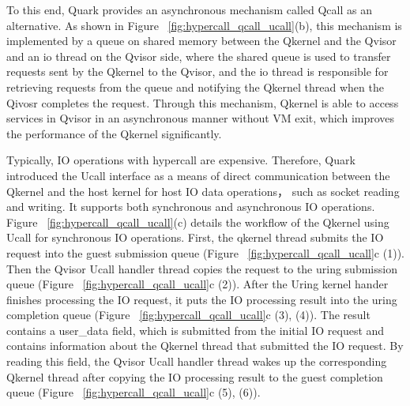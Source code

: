 To this end, Quark provides an asynchronous mechanism called Qcall as an alternative. 
As shown in Figure ~\ref{fig:hypercall_qcall_ucall}(b), this mechanism is implemented by a queue on shared memory between the Qkernel and the Qvisor and an io thread on the Qvisor side, where the
shared queue is used to transfer requests sent by the Qkernel to the Qvisor, and the io thread is responsible for retrieving requests from the queue and notifying the Qkernel thread when the Qivosr completes 
the request. Through this mechanism, Qkernel is able to access services in Qvisor in an asynchronous manner without VM exit, which improves the performance of the Qkernel significantly.

Typically, IO operations with hypercall are expensive. Therefore, Quark introduced the Ucall interface as a means of direct communication between the Qkernel and the host kernel for host 
IO data operations，  such as socket reading and writing. It supports both synchronous and asynchronous IO operations. Figure ~\ref{fig:hypercall_qcall_ucall}(c) details the workflow of the Qkernel 
using Ucall for synchronous IO operations. First, the qkernel thread submits the IO request into the guest submission queue (Figure ~\ref{fig:hypercall_qcall_ucall}c (1)). Then the Qvisor Ucall handler thread copies the request to the uring submission 
queue (Figure ~\ref{fig:hypercall_qcall_ucall}c (2)). After the Uring kernel hander finishes processing the IO request, it puts the IO processing result into the uring completion queue (Figure ~\ref{fig:hypercall_qcall_ucall}c (3), (4)). The result 
contains a user\_data field, which is submitted from the initial IO request and contains information about the Qkernel thread that submitted the IO request. By reading this field, the Qvisor Ucall handler thread wakes up the corresponding Qkernel thread 
after copying the IO processing result to the guest completion queue (Figure ~\ref{fig:hypercall_qcall_ucall}c (5), (6)).




